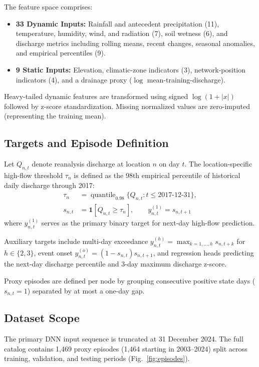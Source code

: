 \documentclass[conference]{IEEEtran}
\begin{document}
The feature space comprises:
\begin{itemize}
    \item \textbf{33 Dynamic Inputs:} Rainfall and antecedent precipitation (11), temperature, humidity, wind, and radiation (7), soil wetness (6), and discharge metrics including rolling means, recent changes, seasonal anomalies, and empirical percentiles (9).
    \item \textbf{9 Static Inputs:} Elevation, climatic-zone indicators (3), network-position indicators (4), and a drainage proxy ($\log$ mean-training-discharge).
\end{itemize}

Heavy-tailed dynamic features are transformed using signed $\log(1+|x|)$ followed by z-score standardization. Missing normalized values are zero-imputed (representing the training mean).

\subsection{Targets and Episode Definition}
Let $Q_{n,t}$ denote reanalysis discharge at location $n$ on day $t$. The location-specific high-flow threshold $\tau_n$ is defined as the 98th empirical percentile of historical daily discharge through 2017:
\begin{align}
\tau_n &= \operatorname{quantile}_{0.98}\{Q_{n,t}: t \leq \text{2017-12-31}\}, \\
s_{n,t} &= \mathbf{1}[Q_{n,t} \geq \tau_n], \qquad y^{(1)}_{n,t} = s_{n,t+1}
\end{align}
where $y^{(1)}_{n,t}$ serves as the primary binary target for next-day high-flow prediction.

Auxiliary targets include multi-day exceedance $y^{(h)}_{n,t} = \max_{k=1,\ldots,h} s_{n,t+k}$ for $h \in \{2, 3\}$, event onset $y^{(o)}_{n,t} = (1 - s_{n,t})s_{n,t+1}$, and regression heads predicting the next-day discharge percentile and 3-day maximum discharge z-score.

Proxy episodes are defined per node by grouping consecutive positive state days ($s_{n,t}=1$) separated by at most a one-day gap.

\subsection{Dataset Scope}
The primary DNN input sequence is truncated at 31 December 2024. The full catalog contains 1,469 proxy episodes (1,464 starting in 2003--2024) split across training, validation, and testing periods (Fig.~\ref{fig:episodes}).
\end{document}
